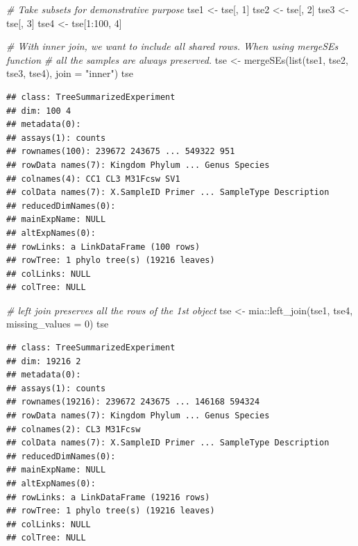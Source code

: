 \documentclass[
]{book}
\newenvironment{Shaded}{\begin{snugshade}}{\end{snugshade}}
\newcommand{\AttributeTok}[1]{\textcolor[rgb]{0.77,0.63,0.00}{#1}}
\newcommand{\CommentTok}[1]{\textcolor[rgb]{0.56,0.35,0.01}{\textit{#1}}}
\newcommand{\DecValTok}[1]{\textcolor[rgb]{0.00,0.00,0.81}{#1}}
\newcommand{\FunctionTok}[1]{\textcolor[rgb]{0.00,0.00,0.00}{#1}}
\newcommand{\NormalTok}[1]{#1}
\newcommand{\OtherTok}[1]{\textcolor[rgb]{0.56,0.35,0.01}{#1}}
\newcommand{\SpecialCharTok}[1]{\textcolor[rgb]{0.00,0.00,0.00}{#1}}
\newcommand{\StringTok}[1]{\textcolor[rgb]{0.31,0.60,0.02}{#1}}
\begin{document}
\begin{Shaded}
\begin{Highlighting}[]
\CommentTok{\# Take subsets for demonstrative purpose}
\NormalTok{tse1 }\OtherTok{\textless{}{-}}\NormalTok{ tse[, }\DecValTok{1}\NormalTok{]}
\NormalTok{tse2 }\OtherTok{\textless{}{-}}\NormalTok{ tse[, }\DecValTok{2}\NormalTok{]}
\NormalTok{tse3 }\OtherTok{\textless{}{-}}\NormalTok{ tse[, }\DecValTok{3}\NormalTok{]}
\NormalTok{tse4 }\OtherTok{\textless{}{-}}\NormalTok{ tse[}\DecValTok{1}\SpecialCharTok{:}\DecValTok{100}\NormalTok{, }\DecValTok{4}\NormalTok{]}
\end{Highlighting}
\end{Shaded}

\begin{Shaded}
\begin{Highlighting}[]
\CommentTok{\# With inner join, we want to include all shared rows. When using mergeSEs function}
\CommentTok{\# all the samples are always preserved.}
\NormalTok{tse }\OtherTok{\textless{}{-}} \FunctionTok{mergeSEs}\NormalTok{(}\FunctionTok{list}\NormalTok{(tse1, tse2, tse3, tse4), }\AttributeTok{join =} \StringTok{"inner"}\NormalTok{)}
\NormalTok{tse}
\end{Highlighting}
\end{Shaded}

\begin{verbatim}
## class: TreeSummarizedExperiment 
## dim: 100 4 
## metadata(0):
## assays(1): counts
## rownames(100): 239672 243675 ... 549322 951
## rowData names(7): Kingdom Phylum ... Genus Species
## colnames(4): CC1 CL3 M31Fcsw SV1
## colData names(7): X.SampleID Primer ... SampleType Description
## reducedDimNames(0):
## mainExpName: NULL
## altExpNames(0):
## rowLinks: a LinkDataFrame (100 rows)
## rowTree: 1 phylo tree(s) (19216 leaves)
## colLinks: NULL
## colTree: NULL
\end{verbatim}

\begin{Shaded}
\begin{Highlighting}[]
\CommentTok{\# left join preserves all the rows of the 1st object}
\NormalTok{tse }\OtherTok{\textless{}{-}}\NormalTok{ mia}\SpecialCharTok{::}\FunctionTok{left\_join}\NormalTok{(tse1, tse4, }\AttributeTok{missing\_values =} \DecValTok{0}\NormalTok{)}
\NormalTok{tse}
\end{Highlighting}
\end{Shaded}

\begin{verbatim}
## class: TreeSummarizedExperiment 
## dim: 19216 2 
## metadata(0):
## assays(1): counts
## rownames(19216): 239672 243675 ... 146168 594324
## rowData names(7): Kingdom Phylum ... Genus Species
## colnames(2): CL3 M31Fcsw
## colData names(7): X.SampleID Primer ... SampleType Description
## reducedDimNames(0):
## mainExpName: NULL
## altExpNames(0):
## rowLinks: a LinkDataFrame (19216 rows)
## rowTree: 1 phylo tree(s) (19216 leaves)
## colLinks: NULL
## colTree: NULL
\end{verbatim}
\end{document}

